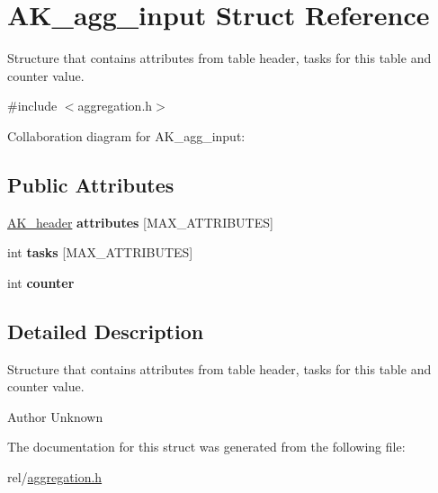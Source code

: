 \hypertarget{structAK__agg__input}{}\section{A\+K\+\_\+agg\+\_\+input Struct Reference}
\label{structAK__agg__input}


Structure that contains attributes from table header, tasks for this table and counter value.  




{\ttfamily \#include $<$aggregation.\+h$>$}



Collaboration diagram for A\+K\+\_\+agg\+\_\+input\+:
\subsection*{Public Attributes}
\begin{DoxyCompactItemize}
\item 
\hyperlink{structAK__header}{A\+K\+\_\+header} {\bfseries attributes} \mbox{[}M\+A\+X\+\_\+\+A\+T\+T\+R\+I\+B\+U\+T\+ES\mbox{]}\hypertarget{structAK__agg__input_a932027458b8c435e69f36ba37fc9de0c}{}\label{structAK__agg__input_a932027458b8c435e69f36ba37fc9de0c}

\item 
int {\bfseries tasks} \mbox{[}M\+A\+X\+\_\+\+A\+T\+T\+R\+I\+B\+U\+T\+ES\mbox{]}\hypertarget{structAK__agg__input_af82e95204d38317274d58ef54c11f19b}{}\label{structAK__agg__input_af82e95204d38317274d58ef54c11f19b}

\item 
int {\bfseries counter}\hypertarget{structAK__agg__input_a008ffea3c7974da90b1176c63874ad5b}{}\label{structAK__agg__input_a008ffea3c7974da90b1176c63874ad5b}

\end{DoxyCompactItemize}


\subsection{Detailed Description}
Structure that contains attributes from table header, tasks for this table and counter value. 

\begin{DoxyAuthor}{Author}
Unknown 
\end{DoxyAuthor}


The documentation for this struct was generated from the following file\+:\begin{DoxyCompactItemize}
\item 
rel/\hyperlink{aggregation_8h}{aggregation.\+h}\end{DoxyCompactItemize}
